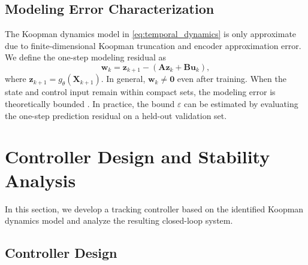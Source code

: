 \documentclass[journal]{IEEEtran}
\newcommand{\vu}{\mathbf{u}}
\newcommand{\vz}{\mathbf{z}}
\newcommand{\vw}{\mathbf{w}}
\newcommand{\mA}{\mathbf{A}}
\newcommand{\mB}{\mathbf{B}}
\newcommand{\mX}{\mathbf{X}}
\begin{document}
\subsection{Modeling Error Characterization}
\label{subsec:modeling_error}

The Koopman dynamics model in \eqref{eq:temporal_dynamics} is only approximate due to finite-dimensional Koopman truncation and encoder approximation error. We define the one-step modeling residual as
\begin{equation}
    \vw_k = \vz_{k+1} - (\mA \vz_k + \mB \vu_k),
    \label{eq:modeling_error}
\end{equation}
where $\vz_{k+1} = g_\theta(\mX_{k+1})$. In general, $\vw_k \neq \mathbf{0}$ even after training. When the state and control input remain within compact sets, the modeling error is theoretically bounded \cite{korda2018linear}. In practice, the bound $\varepsilon$ can be estimated by evaluating the one-step prediction residual on a held-out validation set.


\section{Controller Design and Stability Analysis}
\label{sec:control}

In this section, we develop a tracking controller based on the identified Koopman dynamics model and analyze the resulting closed-loop system.

\subsection{Controller Design}
\label{subsec:controller_design}
\end{document}

